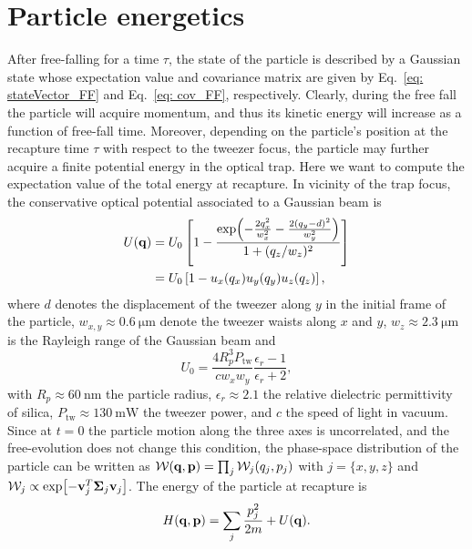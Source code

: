 \documentclass[aps,amssymb,amsmath,prb,superscriptaddress,reprint,notitlepage,onecolumn]{revtex4-1}
\newcommand{\<}{\langle}
\renewcommand{\>}{\rangle}
\begin{document}
\section{Particle energetics}\label{app: particle energy}

After free-falling for a time $\tau$, the state of the particle is described by a Gaussian state whose expectation value and covariance matrix are given by Eq.~\ref{eq: stateVector_FF} and Eq.~\ref{eq: cov_FF}, respectively.
%
Clearly, during the free fall the particle will acquire momentum, and thus its kinetic energy will increase as a function of free-fall time.
%
Moreover, depending on the particle's position at the recapture time $\tau$ with respect to the tweezer focus, the particle may further acquire a finite potential energy in the optical trap.
%
Here we want to compute the expectation value of the total energy at recapture.
%
In vicinity of the trap focus, the conservative optical potential associated to a Gaussian beam is
%
\begin{equation}
\begin{aligned}
	U(\vb{q})&=U_0\left[1-\frac{\exp(-\frac{2q_x^2}{w_x^2}-\frac{2(q_y-d)^2}{w_y^2})}{1+(q_z/w_z)^2}\right]\\
	&=U_0\left[ 1-u_x(q_x)u_y(q_y)u_z(q_z)\right]
    ,
\end{aligned}
\end{equation}
%
where $d$ denotes the displacement of the tweezer along $y$ in the initial frame of the particle, $w_{x,y}\approx \SI{0.6}{\micro\meter}$ denote the tweezer waists along $x$ and $y$, $w_z\approx \SI{2.3}{\micro\meter}$ is the Rayleigh range of the Gaussian beam and 
%
\begin{equation}
	U_0=\frac{4 R_p^3 P_\text{tw}}{c w_x w_y}\frac{\epsilon_r-1}{\epsilon_r+2}
    ,
\end{equation}
%
with $R_p\approx 60~\mathrm{nm}$ the particle radius, $\epsilon_r\approx 2.1$ the relative dielectric permittivity of silica, $P_\text{tw}\approx 130~\text{mW}$ the tweezer power, and $c$ the speed of light in vacuum.
%
Since at $t=0$ the particle motion along the three axes is uncorrelated, and the free-evolution does not change this condition, the phase-space distribution of the particle can be written as $\mathcal{W}(\vb{q},\vb{p})=\prod_j\mathcal{W}_j(q_j,p_j)$ with $j=\lbrace x,y,z\rbrace$ and $\mathcal{W}_j\propto \exp[-\vb{v}_j^T\vb{\Sigma}_j\vb{v}_j]$.
%
The energy of the particle at recapture is
%
\begin{equation}
	H(\vb{q},\vb{p})=\sum_j \frac{p_j^2}{2m} + U(\vb{q})
    .
\end{equation}
\end{document}
